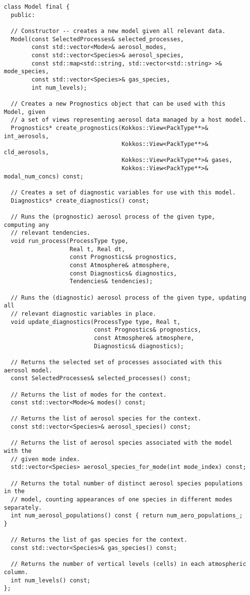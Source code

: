 \begin{lstlisting}
class Model final {
  public:

  // Constructor -- creates a new model given all relevant data.
  Model(const SelectedProcesses& selected_processes,
        const std::vector<Mode>& aerosol_modes,
        const std::vector<Species>& aerosol_species,
        const std::map<std::string, std::vector<std::string> >& mode_species,
        const std::vector<Species>& gas_species,
        int num_levels);

  // Creates a new Prognostics object that can be used with this Model, given
  // a set of views representing aerosol data managed by a host model.
  Prognostics* create_prognostics(Kokkos::View<PackType**>& int_aerosols,
                                  Kokkos::View<PackType**>& cld_aerosols,
                                  Kokkos::View<PackType**>& gases,
                                  Kokkos::View<PackType**>& modal_num_concs) const;

  // Creates a set of diagnostic variables for use with this model.
  Diagnostics* create_diagnostics() const;

  // Runs the (prognostic) aerosol process of the given type, computing any
  // relevant tendencies.
  void run_process(ProcessType type,
                   Real t, Real dt,
                   const Prognostics& prognostics,
                   const Atmosphere& atmosphere,
                   const Diagnostics& diagnostics,
                   Tendencies& tendencies);

  // Runs the (diagnostic) aerosol process of the given type, updating all
  // relevant diagnostic variables in place.
  void update_diagnostics(ProcessType type, Real t,
                          const Prognostics& prognostics,
                          const Atmosphere& atmosphere,
                          Diagnostics& diagnostics);

  // Returns the selected set of processes associated with this aerosol model.
  const SelectedProcesses& selected_processes() const;

  // Returns the list of modes for the context.
  const std::vector<Mode>& modes() const;

  // Returns the list of aerosol species for the context.
  const std::vector<Species>& aerosol_species() const;

  // Returns the list of aerosol species associated with the model with the
  // given mode index.
  std::vector<Species> aerosol_species_for_mode(int mode_index) const;

  // Returns the total number of distinct aerosol species populations in the
  // model, counting appearances of one species in different modes separately.
  int num_aerosol_populations() const { return num_aero_populations_; }

  // Returns the list of gas species for the context.
  const std::vector<Species>& gas_species() const;

  // Returns the number of vertical levels (cells) in each atmospheric column.
  int num_levels() const;
};
\end{lstlisting}

